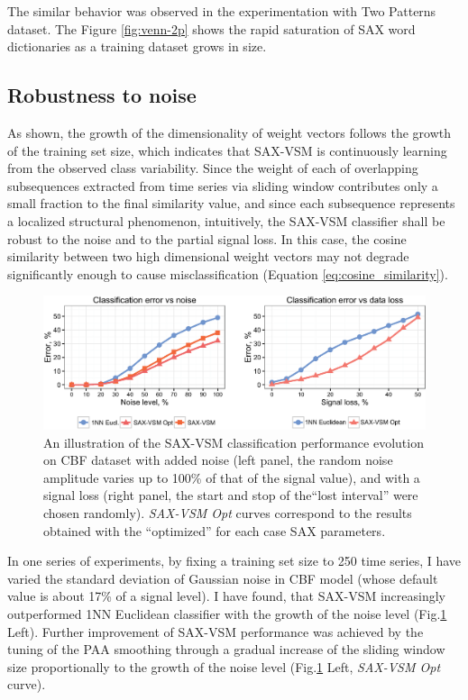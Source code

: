 The similar behavior was observed in the experimentation with Two Patterns dataset. 
The Figure \ref{fig:venn-2p} shows the rapid saturation of SAX word dictionaries as a training dataset grows in size.


\subsection{Robustness to noise}\label{saxvsm_robustness}
As shown, the growth of the dimensionality of \tfidf weight vectors follows the growth of the training set size, which indicates that SAX-VSM is continuously learning from the observed class variability. Since the weight of each of overlapping subsequences extracted from time series via sliding window contributes only a small fraction to the final similarity value, and since each subsequence represents a localized structural phenomenon, intuitively, the SAX-VSM classifier shall be robust to the noise and to the partial signal loss. In this case, the cosine similarity between two high dimensional weight vectors may not degrade significantly enough to cause misclassification (Equation \ref{eq:cosine_similarity}).

\begin{figure}[t]
  \centering
  \includegraphics[width=130mm]{figures/corrupted.eps}
  \caption[An illustration of the SAX-VSM classification performance evolution on CBF dataset with added noise and signal loss.]
  {An illustration of the SAX-VSM classification performance evolution on CBF dataset with added noise 
  (left panel, the random noise amplitude varies up to 100\% of that of the signal value),
  and with a signal loss 
  (right panel, the start and stop of the``lost interval'' were chosen randomly).
  \textit{SAX-VSM Opt} curves correspond to the results obtained with the ``optimized'' for each case 
  SAX parameters.}
  \label{fig:corrupted}
\end{figure}

In one series of experiments, by fixing a training set size to 250 time series, I have varied the standard deviation 
of Gaussian noise in CBF model (whose default value is about 17\% of a signal level). 
I have found, that SAX-VSM increasingly outperformed 1NN Euclidean classifier with the growth of the noise level 
(Fig.\ref{fig:corrupted} Left). 
Further improvement of SAX-VSM performance was achieved by the tuning of the PAA smoothing through a gradual 
increase of the sliding window size proportionally to the growth of the noise level 
(Fig.\ref{fig:corrupted} Left, \textit{SAX-VSM Opt} curve). 

